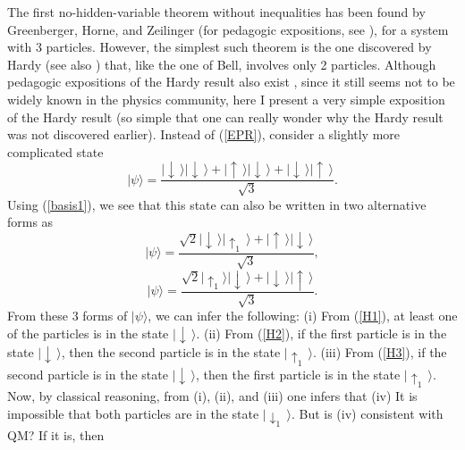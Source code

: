 \documentclass[12pt]{article}
\begin{document}
The first no-hidden-variable theorem without inequalities has 
been found by Greenberger, Horne, and Zeilinger \cite{GHZ}
(for pedagogic expositions, see \cite{merm2,jord,laloe}), for a system 
with 3 particles. However, the simplest such theorem is the one discovered
by Hardy \cite{hardy} (see also \cite{hardy-more}) that, 
like the one of Bell, involves only 2 particles. Although pedagogic
expositions of the Hardy result also exist \cite{jord,merm3,laloe},
since it still seems not to be widely known in the physics community,
here I present a very simple exposition of the Hardy result (so simple 
that one can really wonder why the Hardy result was not discovered 
earlier).    
Instead of (\ref{EPR}), consider a slightly more complicated state
\begin{equation}\label{H1}
|\psi\rangle = \frac{
|\!\downarrow\,\rangle |\!\downarrow\,\rangle +
|\!\uparrow\,\rangle |\!\downarrow\,\rangle +
|\!\downarrow\,\rangle |\!\uparrow\,\rangle }{\sqrt{3}} .
\end{equation}
Using (\ref{basis1}), we see that this state can also be written in two 
alternative forms as
\begin{equation}\label{H2}
|\psi\rangle = \frac{
\sqrt{2} |\!\downarrow\,\rangle |\!\uparrow_1\,\rangle +
|\!\uparrow\,\rangle |\!\downarrow\,\rangle }{\sqrt{3}} ,
\end{equation}
\begin{equation}\label{H3}
|\psi\rangle = \frac{
\sqrt{2} |\!\uparrow_1\rangle |\!\downarrow\,\rangle +
|\!\downarrow\,\rangle |\!\uparrow\,\rangle }{\sqrt{3}} .
\end{equation} 
From these 3 forms of $|\psi\rangle$, we can infer the following: \newline
(i) From (\ref{H1}), at least one of the particles is in the state 
$|\!\downarrow\,\rangle$. \newline
(ii) From (\ref{H2}), if the first particle is in the state 
$|\!\downarrow\,\rangle$, then the second particle is in the state 
$|\!\uparrow_1\,\rangle$. \newline
(iii) From (\ref{H3}), if the second particle is in the state
$|\!\downarrow\,\rangle$, then the first particle is in the state
$|\!\uparrow_1\,\rangle$. \newline
Now, by classical reasoning, from (i), (ii), and (iii) one infers that
\newline
(iv) It is impossible that both particles are in the state 
$|\!\downarrow_1\,\rangle$. \newline
But is (iv) consistent with QM? If it is, then 
\end{document}
